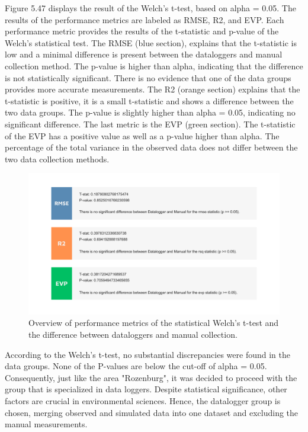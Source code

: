 Figure 5.47 displays the result of the Welch's t-test, based on alpha = 0.05. The results of the performance metrics are labeled as RMSE, R2, and EVP. Each performance metric provides the results of the t-statistic and p-value of the Welch's statistical test. The RMSE (blue section), explains that the t-statistic is low and a minimal difference is present between the dataloggers and manual collection method. The p-value is higher than alpha, indicating that the difference is not statistically significant. There is no evidence that one of the data groups provides more accurate measurements. The R2 (orange section) explains that the t-statistic is positive, it is a small t-statistic and shows a difference between the two data groups. The p-value is slightly higher than alpha = 0.05, indicating no significant difference. The last metric is the EVP (green section). The t-statistic of the EVP has a positive value as well as a p-value higher than alpha. The percentage of the total variance in the observed data does not differ between the two data collection methods.

\clearpage

\begin{figure}[htbp]
    \centering
    \includegraphics[width=0.80\linewidth]{BARPLOTHEIJ.png}
    \caption{Overview of performance metrics of the statistical Welch's t-test and the difference between dataloggers and manual collection.}   
\end{figure}

According to the Welch's t-test, no substantial discrepancies were found in the data groups. None of the P-values are below the cut-off of alpha = 0.05. Consequently, just like the area "Rozenburg", it was decided to proceed with the group that is specialized in data loggers. Despite statistical significance, other factors are crucial in environmental sciences. Hence, the datalogger group is chosen, merging observed and simulated data into one dataset and excluding the manual measurements.

